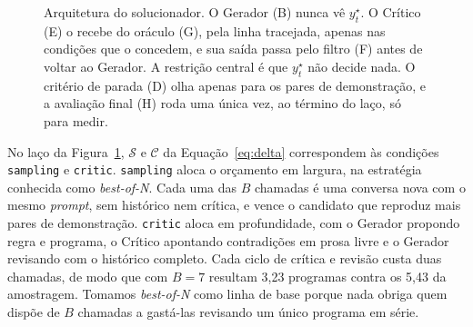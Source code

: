 \documentclass[letterpaper]{article} %
\newcommand{\orcamento}{7}
\newcommand{\AsampProg}{5{,}43} \newcommand{\AcritProg}{3{,}23}
\begin{document}
\begin{figure}[t]
\centering
{}
\caption{Arquitetura do solucionador. O Gerador (B) nunca vê $y^\star_t$. O
Crítico (E) o recebe do oráculo (G), pela linha tracejada, apenas nas condições
que o concedem, e sua saída passa pelo filtro (F) antes de voltar ao Gerador. A
restrição central é que $y^\star_t$ não decide nada. O critério de parada (D)
olha apenas para os pares de demonstração, e a avaliação final (H) roda uma única
vez, ao término do laço, só para medir.}
\label{fig:pipeline}
\end{figure}

No laço da Figura~\ref{fig:pipeline}, $\mathcal{S}$ e $\mathcal{C}$ da
Equação~\ref{eq:delta} correspondem às condições \texttt{sampling} e
\texttt{critic}. \texttt{sampling} aloca o
orçamento em largura, na estratégia conhecida como \emph{best-of-N}. Cada uma das
$B$ chamadas é uma conversa nova com o mesmo \emph{prompt}, sem histórico nem
crítica, e vence o candidato que reproduz mais pares de demonstração.
\texttt{critic} aloca em profundidade, com o Gerador propondo regra e programa, o
Crítico apontando contradições em prosa livre e o Gerador revisando com o
histórico completo. Cada ciclo de crítica e revisão custa duas chamadas, de modo
que com $B = \orcamento$ resultam \AcritProg{} programas contra os \AsampProg{}
da amostragem. Tomamos \emph{best-of-N} como linha de base porque nada obriga
quem dispõe de $B$ chamadas a gastá-las revisando um único programa em série.
\end{document}
